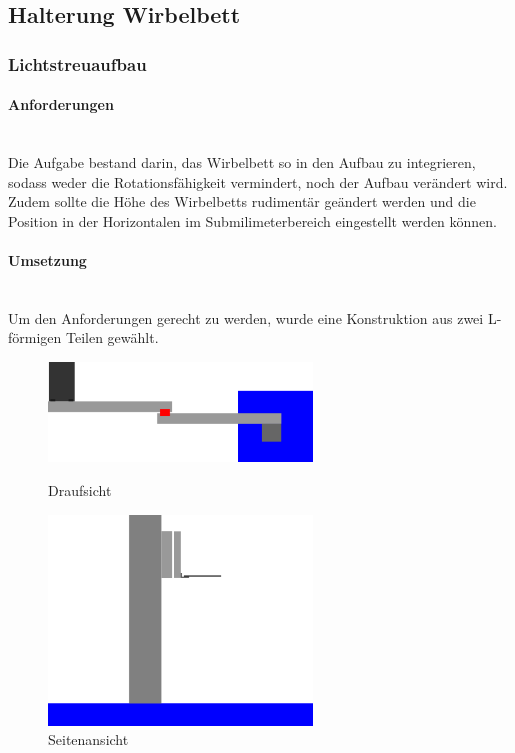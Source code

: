 \subsection{Halterung Wirbelbett}

\subsubsection{Lichtstreuaufbau}


\paragraph{Anforderungen}

\hfill \\
Die Aufgabe bestand darin, das Wirbelbett so in den Aufbau zu integrieren, sodass weder die Rotationsfähigkeit vermindert, noch der Aufbau verändert wird. Zudem sollte die Höhe des Wirbelbetts rudimentär geändert werden und die Position in der Horizontalen im Submilimeterbereich eingestellt werden können. 


\paragraph{Umsetzung}
\hfill \\
Um den Anforderungen gerecht zu werden, wurde eine Konstruktion aus zwei L-förmigen Teilen gewählt. 

\begin{figure}[h]
	\begin{minipage}[hbt]{7cm}
		\centering
		\includegraphics[width=7cm]{Halterung_Lichtstreu_Vogel.png}
		\caption{Draufsicht}
	\end{minipage}
	\hfill
	\begin{minipage}[hbt]{7cm}
		\centering
		\includegraphics[width=7cm]{Halterung_Lichtstreu_Seite.png}
		\caption{Seitenansicht}
	\end{minipage}
\end{figure}


